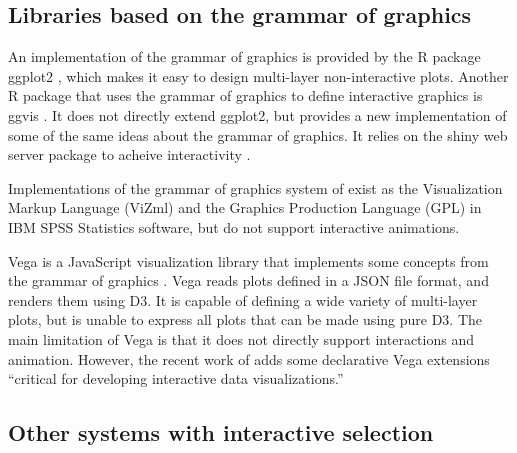 \documentclass[12pt]{article}\usepackage[]{graphicx}\usepackage[]{color}
\begin{document}
\subsection{Libraries based on the grammar of graphics}

An implementation of the grammar of graphics \citep{wilkinson} is
provided by the R package ggplot2 \citep{ggplot2-book}, which makes it
easy to design multi-layer non-interactive plots. Another R package
that uses the grammar of graphics to define interactive graphics is
ggvis \citep{ggvis}. It does not directly extend ggplot2, but provides
a new implementation of some of the same ideas about the grammar of
graphics. It relies on the shiny web server package to acheive
interactivity \citep{shiny}. 

Implementations of the grammar of graphics system of
\citet{wilkinson} exist as the Visualization Markup Language (ViZml)
and the Graphics Production Language (GPL) in IBM SPSS Statistics
software, but do not support interactive animations.

Vega is a JavaScript visualization library that implements some
concepts from the grammar of graphics \citep{vega}. Vega reads plots
defined in a JSON file format, and renders them using D3. It is
capable of defining a wide variety of multi-layer plots, but is unable
to express all plots that can be made using pure D3. The main
limitation of Vega is that it does not directly support
interactions and animation. However, the recent work of
\citet{2014-reactive-vega} adds some declarative Vega extensions
``critical for developing interactive data visualizations.''

\subsection{Other systems with interactive selection}
\end{document}
